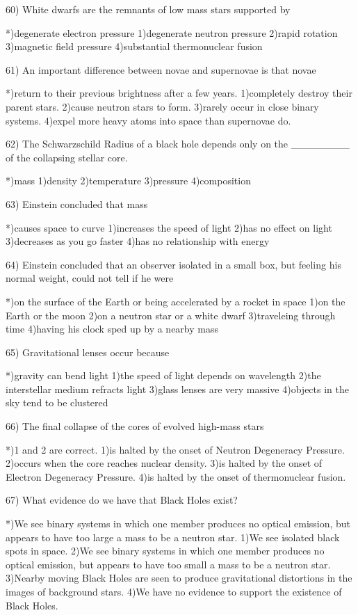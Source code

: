 60) White dwarfs are the remnants of low mass stars supported by
  
 *)degenerate electron pressure
 1)degenerate neutron pressure
 2)rapid rotation
 3)magnetic field pressure
 4)substantial thermonuclear fusion
 
61) An important difference between novae and supernovae is that novae
 
 *)return to their previous brightness after a few years.
 1)completely destroy their parent stars.
 2)cause neutron stars to form.
 3)rarely occur in close binary systems.
 4)expel more heavy atoms into space than supernovae do.
 
62) The Schwarzschild Radius of a black hole depends only on the
    ________ of the collapsing stellar core.
 
 *)mass
 1)density
 2)temperature
 3)pressure
 4)composition 
 
63) Einstein concluded that mass
 
 *)causes space to curve
 1)increases the speed of light
 2)has no effect on light 
 3)decreases as you go faster
 4)has no relationship with energy
 
64) Einstein concluded that an observer isolated in a small box, but
    feeling his normal weight, could not tell if he were
 
 *)on the surface of the Earth or being accelerated by a rocket in space
 1)on the Earth or the moon
 2)on a neutron star or a white dwarf
 3)traveleing through time
 4)having his clock sped up by a nearby mass
 
65) Gravitational lenses occur because
 
 *)gravity can bend light
 1)the speed of light depends on wavelength
 2)the interstellar medium refracts light
 3)glass lenses are very massive
 4)objects in the sky tend to be clustered
 
66) The final collapse of the cores of evolved high-mass stars 
 
 *)1 and 2 are correct.
 1)is halted by the onset of Neutron Degeneracy Pressure.
 2)occurs when the core reaches nuclear density.
 3)is halted by the onset of Electron Degeneracy Pressure.
 4)is halted by the onset of thermonuclear fusion.
 
67) What evidence do we have that Black Holes exist?
 
 *)We see binary systems in which one member produces no optical emission,
   but appears to have too large a mass to be a neutron star.
 1)We see isolated black spots in space.
 2)We see binary systems in which one member produces no optical emission,
   but appears to have too small a mass to be a neutron star.
 3)Nearby moving Black Holes are seen to produce gravitational distortions
   in the images of background stars.
 4)We have no evidence to support the existence of Black Holes.
 
